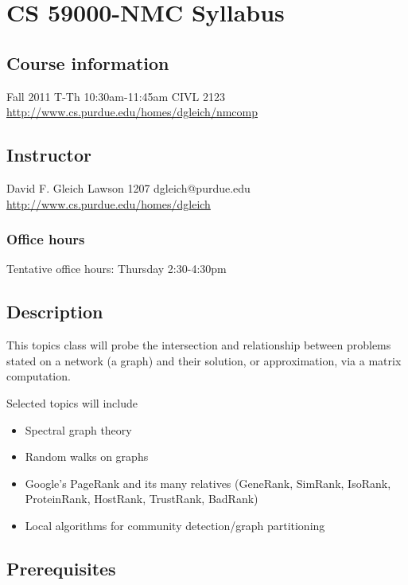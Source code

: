 \documentclass{article}
\begin{document}
 
\hypertarget{cs_59000nmc_syllabus_1}{}\section*{{CS 59000-NMC Syllabus}}\label{cs_59000nmc_syllabus_1}

\hypertarget{course_information_2}{}\subsection*{{Course information}}\label{course_information_2}

Fall 2011 \newline T-Th 10:30am-11:45am \newline CIVL 2123 \newline \url{http://www.cs.purdue.edu/homes/dgleich/nmcomp}

\hypertarget{instructor_3}{}\subsection*{{Instructor}}\label{instructor_3}

David F. Gleich \newline Lawson 1207 \newline dgleich@purdue.edu \newline \url{http://www.cs.purdue.edu/homes/dgleich}

\hypertarget{office_hours_4}{}\subsubsection*{{Office hours}}\label{office_hours_4}

Tentative office hours: Thursday 2:30-4:30pm

\hypertarget{description_5}{}\subsection*{{Description}}\label{description_5}

This topics class will probe the intersection and relationship between problems stated on a network (a graph) and their solution, or approximation, via a matrix computation.

Selected topics will include

\begin{itemize}%
\item Spectral graph theory
\item Random walks on graphs
\item Google'{}s PageRank and its many relatives (GeneRank, SimRank, IsoRank, ProteinRank, HostRank, TrustRank, BadRank)
\item Local algorithms for community detection/graph partitioning

\end{itemize}
\hypertarget{prerequisites_6}{}\subsection*{{Prerequisites}}\label{prerequisites_6}
\end{document}
